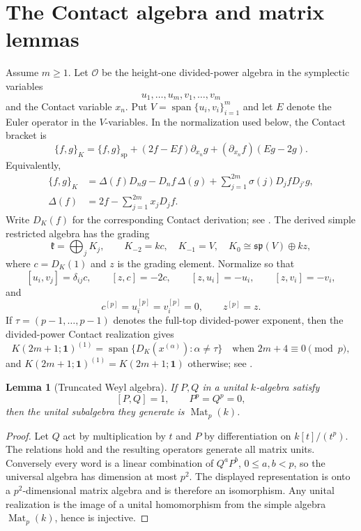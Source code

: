 \documentclass[11pt,reqno]{amsart}
\newtheorem{lemma}[lemma]{Lemma}
\theoremstyle{definition}
\theoremstyle{remark}
\theoremstyle{definition}
\newcommand{\kk}{\mathfrak{k}}
\newcommand{\Mat}{\operatorname{Mat}}
\newcommand{\spn}{\operatorname{span}}
\begin{document}
\section{The Contact algebra and matrix lemmas}\label{sec:contact-setup}

Assume $m\ge1$.  Let $\mathcal O$ be the height-one divided-power algebra in
the symplectic variables
\[
 u_1,\ldots,u_m,v_1,\ldots,v_m
\]
and the Contact variable $x_n$.  Put $V=\spn\{u_i,v_i\}_{i=1}^m$ and let
$E$ denote the Euler operator in the $V$-variables.  In the normalization
used below, the Contact bracket is
\begin{equation}\label{eq:contact-bracket}
 \{f,g\}_K
 =\{f,g\}_{\mathrm{sp}}
 +(2f-Ef)\partial_{x_n}g
 +(\partial_{x_n}f)(Eg-2g).
\end{equation}
Equivalently,
\begin{align*}
 \{f,g\}_K
 &=\Delta(f)D_ng-D_nf\,\Delta(g)
   +\sum_{j=1}^{2m}\sigma(j)D_jfD_{j'}g,\\
 \Delta(f)&=2f-\sum_{j=1}^{2m}x_jD_jf.
\end{align*}
Write $D_K(f)$ for the corresponding Contact derivation; see
\cite[Section~2]{Mygind2014}.  The derived simple restricted algebra has the
grading
\[
 \kk=\bigoplus_jK_j,
 \qquad K_{-2}=kc,\quad K_{-1}=V,
 \quad K_0\cong\mathfrak{sp}(V)\oplus kz,
\]
where $c=D_K(1)$ and $z$ is the grading element.  Normalize so that
\[
 [u_i,v_j]=\delta_{ij}c,
 \qquad [z,c]=-2c,
 \qquad [z,u_i]=-u_i,
 \qquad [z,v_i]=-v_i,
\]
and
\[
 c^{[p]}=u_i^{[p]}=v_i^{[p]}=0,
 \qquad z^{[p]}=z.
\]
If $\tau=(p-1,\ldots,p-1)$ denotes the full-top divided-power
exponent, then the divided-power Contact realization gives
\[
 K(2m+1;\mathbf1)^{(1)}
 =\spn\{D_K(x^{(\alpha)}):\alpha\ne\tau\}
 \quad\text{when }2m+4\equiv0\pmod p,
\]
and $K(2m+1;\mathbf1)^{(1)}=K(2m+1;\mathbf1)$ otherwise; see
\cite[Section~2]{Mygind2014}.

\begin{lemma}[Truncated Weyl algebra]\label{lem:weyl-matrix}
If $P,Q$ in a unital $k$-algebra satisfy
\[
 [P,Q]=1,\qquad P^p=Q^p=0,
\]
then the unital subalgebra they generate is $\Mat_p(k)$.
\end{lemma}

\begin{proof}
Let $Q$ act by multiplication by $t$ and $P$ by differentiation on
$k[t]/(t^p)$.  The relations hold and the resulting operators generate all
matrix units.  Conversely every word is a linear combination of
$Q^aP^b$, $0\le a,b<p$, so the universal algebra has dimension at most
$p^2$.  The displayed representation is onto a $p^2$-dimensional matrix
algebra and is therefore an isomorphism.  Any unital realization is the
image of a unital homomorphism from the simple algebra $\Mat_p(k)$, hence is
injective.
\end{proof}
\end{document}
